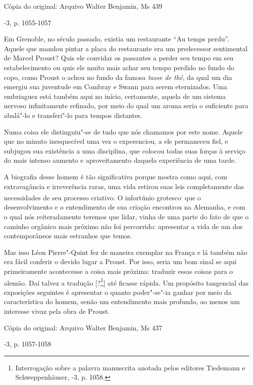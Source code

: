 Cópia do original: Arquivo Walter Benjamin, Ms 439

-3, p. 1055-1057

Em Grenoble, no século passado, existia um restaurante ``Au temps
perdu''. Aquele que mandou pintar a placa do restaurante era um
predecessor sentimental de Marcel Proust? Quis ele convidar os passantes
a perder seu tempo em seu estabelecimento ou quis ele muito mais achar
seu tempo perdido no fundo do copo, como Proust o achou no fundo da
famosa \emph{tasse de thé}, da qual um dia emergiu sua juventude em
Combray e Swann para serem eternizados. Uma embriaguez está também aqui
no início, certamente, aquela de um sistema nervoso infinitamente
refinado, por meio do qual um aroma seria o suficiente para abalá"-lo e
transferi"-lo para tempos distantes.

Numa coisa ele distinguiu"-se de tudo que nós chamamos por este nome.
Aquele que no minuto inesquecível uma vez o experenciou, a ele
permaneceu fiel, e subjugou sua existência a uma disciplina, que colocou
todas suas forças à serviço do mais intenso aumento e aproveitamento
daquela experiência de uma tarde.

A biografia desse homem é tão significativa porque mostra como aqui, com
extravagância e irreverência raras, uma vida retirou suas leis
completamente das necessidades de seu processo criativo. O infortúnio
grotesco\textsuperscript{,} que o desenvolvimento e o entendimento de
sua criação encontrou na Alemanha, e com o qual nós reiteradamente
teremos que lidar, vinha de uma parte do fato de que o caminho orgânico
mais próximo não foi percorrido: apresentar a vida de um dos
contemporâneos mais estranhos que temos.

Mas isso Léon Pierre"-Quint fez de maneira exemplar na França e lá também
não era fácil conferir o devido lugar a Proust. Por isso, seria um bom
sinal se aqui primeiramente acontecesse a coisa mais próxima: traduzir
essas coisas para o alemão. Daí talvez a tradução {[}?\footnote{Interrogação sobre a palavra manuscrita anotada pelos editores
  Tiedemann e Schweppenhäuser, -3, p. 1058. \versal{[N. T.]}}{]} até ficasse
rápida. Um propósito tangencial das exposições seguintes é apresentar o
quanto poder"-se"-ia ganhar por meio da característica do homem, senão um
entendimento mais profundo, ao menos um interesse vivaz pela obra de
Proust.

Cópia do original: Arquivo Walter Benjamin, Ms 437

-3, p. 1057-1058

